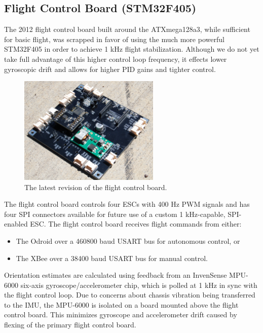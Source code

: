 \documentclass[12pt,letterpaper]{article} \usepackage[margin=1in]{geometry}
\begin{document}
\subsection*{Flight Control Board (STM32F405)}

The 2012 flight control board built around the ATXmega128a3, while sufficient
for basic flight, was scrapped in favor of using the much more powerful
STM32F405 in order to achieve 1 kHz flight stabilization. Although we do not
yet take full advantage of this higher control loop frequency, it effects lower
gyroscopic drift and allows for higher PID gains and tighter control.

\begin{figure}[!h]
	\centering
	\includegraphics[width=0.6\textwidth]{img/flight_control.jpg}
	\caption{The latest revision of the flight control board.}
	\label{fig:fcboard}
\end{figure}

The flight control board controls four ESCs with 400 Hz PWM signals and has
four SPI connectors available for future use of a custom 1 kHz-capable,
SPI-enabled ESC. The flight control board receives flight commands from either:

\begin{itemize}
	\item The Odroid over a 460800 baud USART bus for autonomous control, or
	\item The XBee over a 38400 baud USART bus for manual control.
\end{itemize}

Orientation estimates are calculated using feedback from an InvenSense MPU-6000
six-axis gyroscope/accelerometer chip, which is polled at 1 kHz in sync with
the flight control loop. Due to concerns about chassis vibration being
transferred to the IMU, the MPU-6000 is isolated on a board mounted above the
flight control board. This minimizes gyroscope and accelerometer drift caused by
flexing of the primary flight control board.
\end{document}

